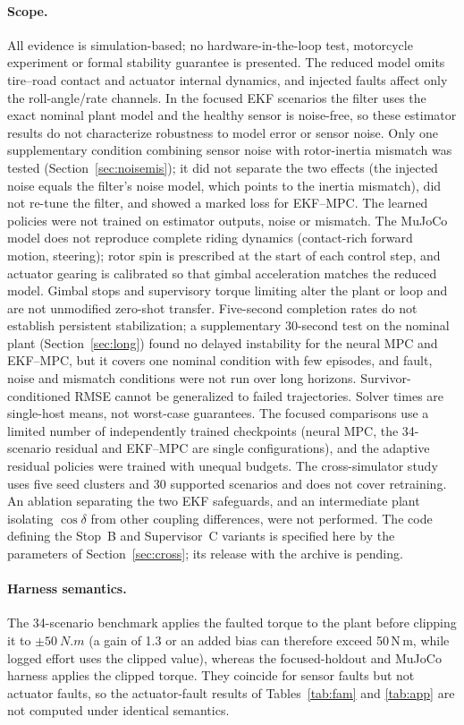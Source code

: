 \documentclass[preprint,12pt,authoryear=false]{elsarticle}
\theoremstyle{remark}\newtheorem{remark}{Remark}
\theoremstyle{plain}\newtheorem{proposition}{Proposition}\newtheorem{lemma}{Lemma}
\theoremstyle{definition}\newtheorem{assumption}{Assumption}
\begin{document}
\paragraph{Scope.} All evidence is simulation-based; no hardware-in-the-loop test, motorcycle experiment or formal stability guarantee is presented. The reduced model omits tire--road contact and actuator internal dynamics, and injected faults affect only the roll-angle/rate channels. In the focused EKF scenarios the filter uses the exact nominal plant model and the healthy sensor is noise-free, so these estimator results do not characterize robustness to model error or sensor noise. Only one supplementary condition combining sensor noise with rotor-inertia mismatch was tested (Section~\ref{sec:noisemis}); it did not separate the two effects (the injected noise equals the filter's noise model, which points to the inertia mismatch), did not re-tune the filter, and showed a marked loss for EKF--MPC. The learned policies were not trained on estimator outputs, noise or mismatch. The MuJoCo model does not reproduce complete riding dynamics (contact-rich forward motion, steering); rotor spin is prescribed at the start of each control step, and actuator gearing is calibrated so that gimbal acceleration matches the reduced model. Gimbal stops and supervisory torque limiting alter the plant or loop and are not unmodified zero-shot transfer. Five-second completion rates do not establish persistent stabilization; a supplementary 30-second test on the nominal plant (Section~\ref{sec:long}) found no delayed instability for the neural MPC and EKF--MPC, but it covers one nominal condition with few episodes, and fault, noise and mismatch conditions were not run over long horizons. Survivor-conditioned RMSE cannot be generalized to failed trajectories. Solver times are single-host means, not worst-case guarantees. The focused comparisons use a limited number of independently trained checkpoints (neural MPC, the 34-scenario residual and EKF--MPC are single configurations), and the adaptive residual policies were trained with unequal budgets. The cross-simulator study uses five seed clusters and 30 supported scenarios and does not cover retraining. An ablation separating the two EKF safeguards, and an intermediate plant isolating $\cos\delta$ from other coupling differences, were not performed. The code defining the Stop~B and Supervisor~C variants is specified here by the parameters of Section~\ref{sec:cross}; its release with the archive is pending.

\paragraph{Harness semantics.} The 34-scenario benchmark applies the faulted torque to the plant before clipping it to $\pm\SI{50}{N.m}$ (a gain of 1.3 or an added bias can therefore exceed 50\,N\,m, while logged effort uses the clipped value), whereas the focused-holdout and MuJoCo harness applies the clipped torque. They coincide for sensor faults but not actuator faults, so the actuator-fault results of Tables~\ref{tab:fam} and \ref{tab:app} are not computed under identical semantics.
\end{document}
